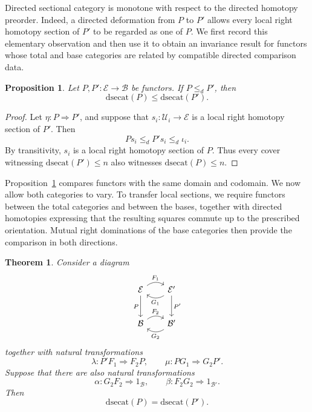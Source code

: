 \documentclass[12pt]{amsart}
\newtheorem{theorem}[teo]{Theorem}
\newtheorem{prop}[teo]{Proposition}
\theoremstyle{definition}
\theoremstyle{remark}
\numberwithin{figure}{section}%
\newcommand{\Ba}{\mathcal{B}}
\newcommand{\E}{\mathcal{E}}
\newcommand{\Uc}{\mathcal{U}}
\begin{document}
Directed sectional category is monotone with respect to the directed
homotopy preorder. Indeed, a directed deformation from \(P\) to \(P'\)
allows every local right homotopy section of \(P'\) to be regarded as one
of \(P\). We first record this elementary observation and then use it to
obtain an invariance result for functors whose total and base categories
are related by compatible directed comparison data.

\begin{prop}\label{prop:dsecat_monotone_homotopy}
Let \(P,P'\colon\E\to\Ba\) be functors. If \(P\leq_dP'\), then
\[
\mathrm{dsecat}(P)\leq\mathrm{dsecat}(P').
\]
\end{prop}

\begin{proof}
Let \(\eta\colon P\Rightarrow P'\), and suppose that
\(s_i\colon\Uc_i\to\E\) is a local right homotopy section of \(P'\).
Then
\[
Ps_i
\leq_d
P's_i
\leq_d
\iota_i.
\]
By transitivity, \(s_i\) is a local right homotopy section of \(P\).
Thus every cover witnessing \(\mathrm{dsecat}(P')\leq n\) also witnesses
\(\mathrm{dsecat}(P)\leq n\).
\end{proof}

Proposition~\ref{prop:dsecat_monotone_homotopy} compares functors with the same
domain and codomain. We now allow both categories to vary. To transfer
local sections, we require functors between the total categories and
between the bases, together with directed homotopies expressing that the
resulting squares commute up to the prescribed orientation. Mutual right
dominations of the base categories then provide the comparison in both
directions.

\begin{theorem}\label{thr:dsecat_invariance_lax_equivalence}
Consider a diagram
\[
\begin{tikzcd}[column sep=2em, row sep=2.5em]
\E
  \arrow[r, "F_1", bend left=35]
  \arrow[d, "P"']
&
\E'
  \arrow[l, "G_1", bend left=35]
  \arrow[d, "P'"]
\\
\Ba
  \arrow[r, "F_2", bend left=35]
&
\Ba'
  \arrow[l, "G_2", bend left=35]
\end{tikzcd}
\]
together with natural transformations
\[
\lambda\colon P'F_1\Rightarrow F_2P,
\qquad
\mu\colon PG_1\Rightarrow G_2P'.
\]
Suppose that there are also natural transformations
\[
\alpha\colon G_2F_2\Rightarrow1_\Ba,
\qquad
\beta\colon F_2G_2\Rightarrow1_{\Ba'}.
\]
Then
\[
\mathrm{dsecat}(P)=\mathrm{dsecat}(P').
\]
\end{theorem}
\end{document}
